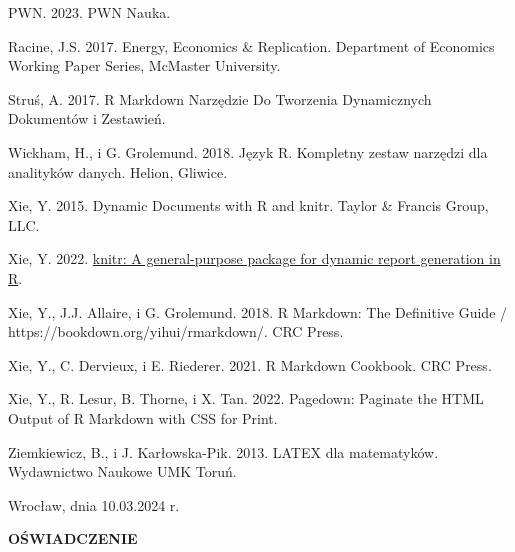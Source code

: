 \documentclass[
  12pt,
]{article}
\newlength{\cslhangindent}
\newlength{\cslentryspacingunit} %
\newenvironment{CSLReferences}[2] %
 {%
  \setlength{\parindent}{0pt}
  \ifodd #1
  \let\oldpar\par
  \def\par{\hangindent=\cslhangindent\oldpar}
  \fi
  \setlength{\parskip}{#2\cslentryspacingunit}
 }%
 {}
\begin{document}
\begin{CSLReferences}{1}{0}
\leavevmode{}%
PWN. 2023. PWN Nauka.

\leavevmode{}%
Racine, J.S. 2017. Energy, {Economics} \& {Replication}. Department of
Economics Working Paper Series, McMaster University.

\leavevmode{}%
Struś, A. 2017. R {Markdown} Narzędzie Do Tworzenia Dynamicznych
Dokumentów i Zestawień.

\leavevmode{}%
Wickham, H., i G. Grolemund. 2018. J{ę}zyk R. Kompletny zestaw
narz{ę}dzi dla analityków danych. Helion, Gliwice.

\leavevmode{}%
Xie, Y. 2015. Dynamic Documents with R and knitr. Taylor \& Francis
Group, LLC.

\leavevmode{}%
Xie, Y. 2022. \href{https://yihui.org/knitr/}{knitr: A general-purpose
package for dynamic report generation in R}.

\leavevmode{}%
Xie, Y., J.J. Allaire, i G. Grolemund. 2018. R {Markdown}: {The
Definitive Guide} / {https://bookdown.org/yihui/rmarkdown/}. {CRC
Press}.

\leavevmode{}%
Xie, Y., C. Dervieux, i E. Riederer. 2021. R {Markdown Cookbook}. {CRC
Press}.

\leavevmode{}%
Xie, Y., R. Lesur, B. Thorne, i X. Tan. 2022. Pagedown: {Paginate} the
{HTML} Output of {R} Markdown with {CSS} for Print.

\leavevmode{}%
Ziemkiewicz, B., i J. Karłowska-Pik. 2013. LATEX dla matematyków.
Wydawnictwo Naukowe UMK Toru{ń}.

\end{CSLReferences}

\FloatBarrier
\newpage
{}
\listoffigures
{}

\newpage
\pagestyle{plain}

\begin{flushright} 
Wrocław, dnia 10.03.2024 r.
\end{flushright}

\normalsize

\begin{center}
\textbf{OŚWIADCZENIE}
\end{center}
\end{document}
